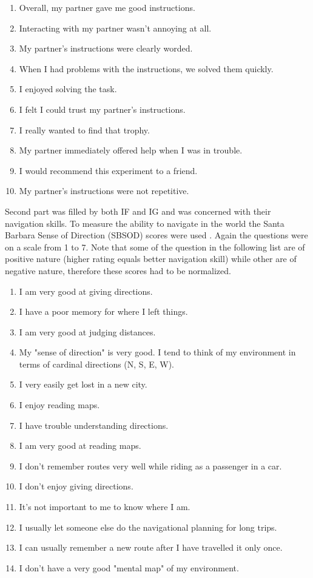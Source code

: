 \begin{table}
\begin{enumerate}
\item
Overall, my partner gave me good instructions.
\item
Interacting with my partner wasn't annoying at all.
\item
My partner's instructions were clearly worded.
\item
When I had problems with the instructions, we solved them quickly.
\item
I enjoyed solving the task.
\item
I felt I could trust my partner's instructions.
\item
I really wanted to find that trophy.
\item
My partner immediately offered help when I was in trouble.
\item
I would recommend this experiment to a friend.
\item
My partner's instructions were not repetitive.
\end{enumerate}
\end{table}

Second part was filled by both IF and IG and was concerned with their navigation skills. To measure the ability to navigate in the world the Santa Barbara Sense of Direction (SBSOD) scores were used \citet{hegarty2002development}. Again the questions were on a scale from 1 to 7. Note that some of the question in the following list are of positive nature (higher rating equals better navigation skill) while other are of negative nature, therefore these scores had to be normalized.

\begin{table}
\begin{enumerate}
\item
I am very good at giving directions.
\item
I have a poor memory for where I left things.
\item
I am very good at judging distances.
\item
My "sense of direction" is very good.
I tend to think of my environment in terms of cardinal directions (N, S, E, W).
\item
I very easily get lost in a new city.
\item
I enjoy reading maps.
\item
I have trouble understanding directions.
\item
I am very good at reading maps.
\item
I don't remember routes very well while riding as a passenger in a car.
\item
I don't enjoy giving directions.
\item
It's not important to me to know where I am.
\item
I usually let someone else do the navigational planning for long trips.
\item
I can usually remember a new route after I have travelled it only once.
\item
I don't have a very good "mental map" of my environment.
\end{enumerate}
\end{table}

